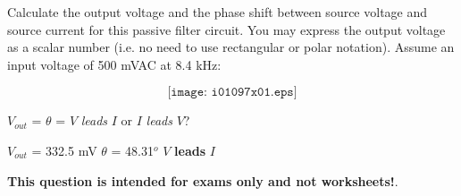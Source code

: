 

Calculate the output voltage and the phase shift between source voltage and source current for this passive filter circuit.  You may express the output voltage as a scalar number (i.e. no need to use rectangular or polar notation).  Assume an input voltage of 500 mVAC at 8.4 kHz:

$$\texttt{[image: i01097x01.eps]}$$

$V_{out}$ = \hskip 100pt $\theta$ = \hskip 100pt $V$ {\it leads} $I$ or $I$ {\it leads} $V$?

\vskip 10pt







$V_{out}$ = 332.5 mV \hskip 100pt $\theta$ = 48.31$^{o}$ \hskip 100pt $V$ {\bf leads} $I$







{\bf This question is intended for exams only and not worksheets!}.



